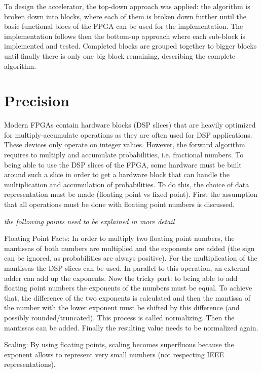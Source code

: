 \documentclass[mscthesis]{usiinfthesis}
\begin{document}
To design the accelerator, the top-down approach was applied: the algorithm is
broken down into blocks, where each of them is broken down further until the
basic functional blocs of the FPGA can be used for the implementation. The
implementation follows then the bottom-up approach where each sub-block is
implemented and tested. Completed blocks are grouped together to bigger blocks
until finally there is only one big block remaining, describing the complete
algorithm.

\section{Precision}

Modern FPGAs contain hardware blocks (DSP slices) that are heavily optimized
for multiply-accumulate operations as they are often used for DSP applications.
These devices only operate on integer values. However, the forward algorithm
requires to multiply and accumulate probabilities, i.e. fractional numbers. To
being able to use the DSP slices of the FPGA, some hardware must be built
around such a slice in order to get a hardware block that can handle the
multiplication and accumulation of probabilities. To do this, the choice of
data representation must be made (floating point vs fixed point). First the
assumption that all operations must be done with floating point numbers is
discussed.

\emph{\color{red}the following points need to be explained in more detail}

Floating Point Facts:
In order to multiply two floating point numbers, the mantissas of
both numbers are multiplied and the exponents are added (the sign can be
ignored, as probabilities are always positive). For the multiplication of the
mantissas the DSP slices can be used. In parallel to this operation, an
external adder can add up the exponents. Now the tricky part: to being able to
add floating point numbers the exponents of the numbers must be equal. To
achieve that, the difference of the two exponents is calculated and then the
mantissa of the number with the lower exponent must be shifted by this
difference (and possibly rounded/truncated). This process is called
normalizing. Then the mantissas can be added. Finally the resulting value
needs to be normalized again.

Scaling: By using floating points, scaling becomes superfluous because the
exponent allows to represent very small numbers (not respecting IEEE
representations).
\end{document}
